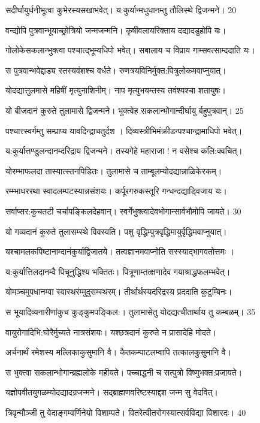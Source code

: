  सदीर्घायुर्धनीभूत्वा कुभेरस्यसखाभवेत्।
 य:कुर्यान्मधुधानम्तु तौलिस्थे द्विजन्मने। 20
 
  वन्द्योपि पुत्रवान्भूयाच्छ्रोत्रियो जन्मजन्मनि।
 कृषीवलायरिक्ताय दद्यादडुहोपि यः।
 
 गोलोकेसकलान्भुक्त्वा पश्चात्द्भूम्यधिपो भवेत्।
 सबालाय च विप्राय गाम्सवत्साम्ददाति यः।
 
 स पुत्रवान्भवेद्दाड्य स्तस्यवंशश्च वर्धते।
 रुणत्रयविनिर्मुक्त:पित्रुलोकमवाप्नुयात्।
 
 योदद्यात्तुलमासे महिषीं मृत्युनाशिनीम्।
 नाप मृत्युभयम्तस्य तवंश्यश्चा शतायुषः।
 
 यो बीजदानं कुरुते तुलामासे द्विजन्मने।
 भुक्त्वेह सकलान्भोगान्दीर्घायु र्बहुपुत्रवान्। 25
 
  पश्चात्त्स्वर्गम्तु सम्प्राप्य यावदिन्द्राचतुर्दश ।
 दिव्यस्त्रीभिमंक्रीडन्पश्चान्द्रामाधिपो भवेत्।
 
 य:कुर्यात्तण्डुलन्दानम्दरिद्राय द्विजन्मने।
 तस्यगेहे महाराजा ! न वसेश्च कलि:क्वचित्।
 
 योरम्भाफलदा तास्यात्स्तनपिडितः।
 तुलामासे च ताम्बूलम्योदद्यान्नाळिकेरकम्।
 
 रम्म्भाधररथा स्वादलम्पटस्यान्नसंशयः।
 कर्पूरगरुकस्तूरि गन्धन्दद्याड्विजाय यः।

सर्वाप्सर:कुचतटी चर्चापङ्किलदेहवान्।
 स्वर्गेभुक्त्वादेवभोगान्सार्वभौमोपि जायते। 30

  यो गव्यदानं कुरुते तुलासम्स्थे विवस्वति।
 पशु वृद्धिम्पुत्रवृद्धिमायुर्वृद्धिमवाप्नुयात्।

 यश्चामलकपिष्टानाम्दानंकुर्याद्विजातये।
 तत्वज्ञानमवाप्नोति सस्स्याद्भागवतोत्तमः ।

 य:कुर्यात्तिलदानम्वै पिचूनुद्धिश्य भक्तितः।
 पित्रूणाम्तत्क्षणादेव गयाश्राद्धफलम्भवेत्।

 योमञ्चमुपधानम्वा स्वास्थरंम्मुदुसम्स्थरम्।
 तीर्थार्थस्यदरिद्रस्य प्रददाति कुटुम्बिनः।

 स भूयादिव्यनारीणांकुच कुङ्कुमपङ्किल:।
 तुलामासेतु योदद्यत्चीतार्थाय तु कम्बळम्। 35

  वायुरोगादिभि:घोरैर्मुच्यते नात्रसंशयः।
 यश्छत्रदानं कुरुते न प्रासादेहि मोदते।

 अर्चनार्थं रमेशस्य मल्लिकाकुसुमानि वै।
 कैतकम्पाटलम्वापि तत्कालकुसुमानि वै।

 स भुक्त्वा सकलान्भोगान्ब्रह्मलोके महीयते।
 पच्चाद्धनी च सत्पुत्रो विष्णुभक्त:प्रजायते।

 यज्ञोपवीतयुगळम्योदद्यादग्रजन्मने।
 सद्ब्राह्मणवरिष्टस्याद्दश जन्म सु वेदवित्।

 त्रिवृन्मौञ्जी तु वेदाङ्गम्वर्णिनेयो विशाम्पते।
 वितरेत्वीतरोगस्यात्सर्वविद्या विशारदः। 40

